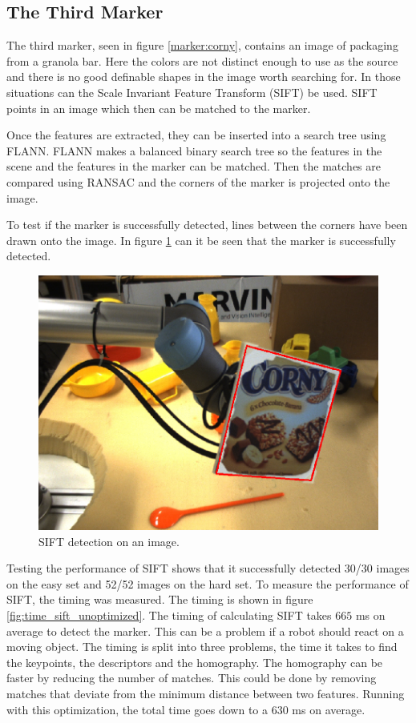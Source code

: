 \subsection{The Third Marker}\label{sec:full_marker3}
The third marker, seen in figure \ref{marker:corny}, contains an image of packaging from a granola bar.
Here the colors are not distinct enough to use as the source and there is no good definable shapes in the image worth searching for.
In those situations can the Scale Invariant Feature Transform (SIFT) be used.
SIFT points in an image which then can be matched to the marker.

Once the features are extracted, they can be inserted into a search tree using FLANN.
FLANN makes a balanced binary search tree so the features in the scene and the features in the marker can be matched.
Then the matches are compared using RANSAC and the corners of the marker is projected onto the image. 

To test if the marker is successfully detected, lines between the corners have been drawn onto the image.
In figure \ref{fig:sift_detection} can it be seen that the marker is successfully detected.

\begin{figure}[h]
 \centering
 \includegraphics[width=0.5\linewidth]{graphics/sift_detection}
 \caption{SIFT detection on an image.}
 \label{fig:sift_detection}
\end{figure}

Testing the performance of SIFT shows that it successfully detected 30/30 images on the easy set and 52/52 images on the hard set.
To measure the performance of SIFT, the timing was measured. 
The timing is shown in figure \ref{fig:time_sift_unoptimized}. 
The timing of calculating SIFT takes $665$ ms on average to detect the marker.
This can be a problem if a robot should react on a moving object.
The timing is split into three problems, the time it takes to find the keypoints, the descriptors and the homography.
The homography can be faster by reducing the number of matches.
This could be done by removing matches that deviate from the minimum distance between two features.
Running with this optimization, the total time goes down to a $630$ ms on average.


